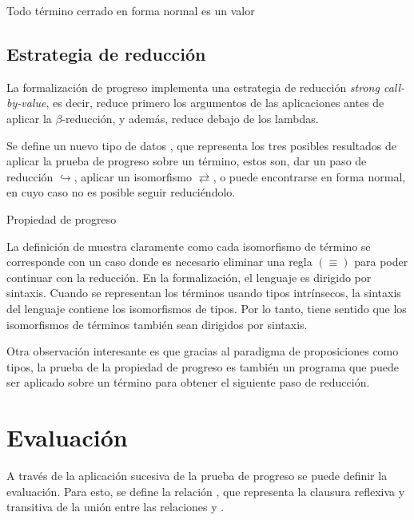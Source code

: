 \begin{codigo}
	Todo término cerrado en forma normal es un valor
\end{codigo}

\subsection{Estrategia de reducción}

La formalización de progreso implementa una estrategia de reducción \textit{strong call-by-value}, es decir, reduce primero los argumentos de las aplicaciones antes de aplicar la $\beta$-reducción, y además, reduce debajo de los lambdas.

Se define un nuevo tipo de datos , que representa los tres posibles resultados de aplicar la prueba de progreso sobre un término, estos son, dar un paso de reducción $\hookrightarrow$, aplicar un isomorfismo $\rightleftarrows$, o puede encontrarse en forma normal, en cuyo caso no es posible seguir reduciéndolo.

\begin{codigo}
	Propiedad de progreso
\end{codigo}

La definición de  muestra claramente como cada isomorfismo de término se corresponde con un caso donde es necesario eliminar una regla $(\equiv)$ para poder continuar con la reducción.
En la formalización, el lenguaje es dirigido por sintaxis.
Cuando se representan los términos usando tipos intrínsecos, la sintaxis del lenguaje contiene los isomorfismos de tipos.
Por lo tanto, tiene sentido que los isomorfismos de términos también sean dirigidos por sintaxis.

Otra observación interesante es que gracias al paradigma de proposiciones como tipos, la prueba de la propiedad de progreso es también un programa que puede ser aplicado sobre un término para obtener el siguiente paso de reducción.

\section{Evaluación}

A través de la aplicación sucesiva de la prueba de progreso se puede definir la evaluación.
Para esto, se define la relación \type{$\_\rightsquigarrow\_$}, que representa la clausura reflexiva y transitiva de la unión entre las relaciones \type{$\_\hookrightarrow\_$} y \type{$\_\rightleftarrows\_$}.

